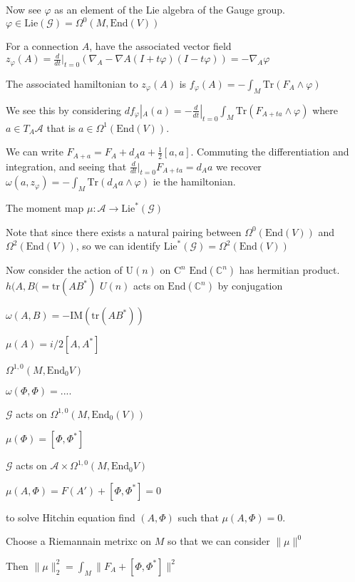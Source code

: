 Now see $ \varphi $ as an element of the Lie algebra of the Gauge group. 
$ \varphi \in \mathrm{Lie} ( \mathcal{G} ) = \Omega^0 (M, \mathrm{End} ( V)) $

For a connection $A$, have the associated vector field
$ z_\varphi ( A) = \frac{d}{dt} |_{t=0 } ( \nabla_A - \nabla{A} ( I + t \varphi ) ( I -t \varphi) ) = - \nabla_A \varphi $

The associated hamiltonian to $z_\varphi ( A)$ is  
$ f_\varphi (A) = - \int_M \mathrm{Tr} (F_A \wedge \varphi ) $

We see this by considering
$ d f_\varphi |_A (a) = - \frac{d}{dt} |_{t=0} \int_M \mathrm{Tr} ( F_{A+t a} \wedge \varphi) $
where $a \in T_A \mathcal{A} $ that is $ a \in \Omega^1(\mathrm{End}(V) ) $.  

We can write
$F_{A+a } = F_A + d_A a + \frac{1}{2} [a,a ]$. 
Commuting the differentiation and integration, 
and seeing that $ \frac{d}{dt}|_{t=0} F_{A+ta} = d_A a  $
we recover $ \omega ( a , z_\varphi) =  - \int_M \mathrm{Tr} (d_A a \wedge \varphi)  $ ie the hamiltonian. 

The moment map
$\mu : \mathcal{A} \rightarrow  \mathrm{Lie}^* ( \mathcal{G} )$ 

Note that since there exists a natural pairing between $ \Omega ^0 ( \mathrm{End}(V))$ and $ \Omega ^2 ( \mathrm{End}(V)) $, so we can identify 
$ \mathrm{Lie}^*(\mathcal{G}) = \Omega ^2 ( \mathrm{End}(V))$ 


Now consider the action of $\mathrm{U} ( n) $ on $\mathrm{C} ^n $ 
$ \mathrm{End} (\mathbb{C} ^n) $ has hermitian product.
$h(A,B( = \mathrm{tr} ( AB^*) $
$U(n) $ acts on $ \mathrm{End} ( \mathbb{C} ^n) $ by conjugation 

$\omega(A,B) = - \mathrm{IM}(\mathrm{tr}( AB^*)) $

$ \mu (A) = i/2 [ A, A^*] $ 

$ \Omega^{1,0} ( M, \mathrm{End}_0 V ) $

$\omega(\Phi, \Phi )  = .... $ 

$\mathcal{G} $ acts on $ \Omega^{1,0}( M, \mathrm{End} _0 (V) ) $

$ \mu(\Phi ) = [ \Phi , \Phi ^* ] $ 

$ \mathcal{G} $ acts on $ \mathcal{A} \times \Omega^{1,0} (M , \mathrm{End}_0 V ) $ 

$ \mu( A, \Phi) = F ( A') + [\Phi , \Phi ^* ] = 0 $ 

to solve Hitchin equation find $(A, \Phi) $ such that $ \mu( A, \Phi) = 0 $. 

Choose a Riemannain metrixc on $M$ so that we can consider $ \| \mu \| ^0 $ 

Then $ \| \mu \|_2 ^ 2 = \int _M \| F_A + [\Phi , \Phi^* ] \| ^2 $ 











 

